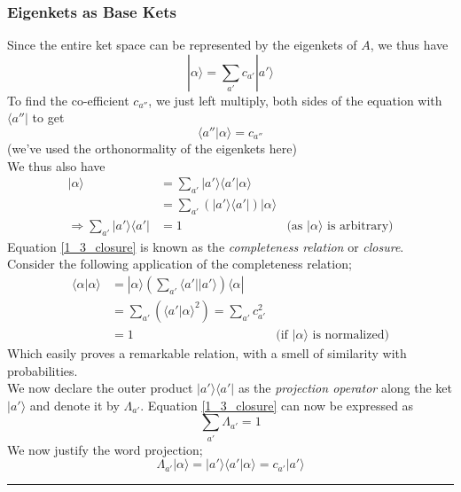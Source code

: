 \documentclass[12pt]{article}
\def\bra#1{\langle#1|}
\def\ket#1{|#1 \rangle}
\def\inpr#1#2{\langle #1|#2 \rangle}
\begin{document}
			\subsubsection{Eigenkets as Base Kets}
				Since the entire ket space can be represented by the eigenkets of $A$, we thus have
				\begin{equation}
					\ket \alpha = \sum_{a'} c_{a'}\ket{a'}
				\end{equation}
				To find the co-efficient $c_{a''}$, we just left multiply, both sides of the equation with $\bra {a''}$ to get
				\begin{equation}
					\inpr {a''}{\alpha} = c_{a''}
				\end{equation}
				(we've used the orthonormality of the eigenkets here)\\
				We thus also have
				\begin{align}
					\ket \alpha &= \sum_{a'} \ket {a'} \inpr {a'}{\alpha} \\
								&= \sum_{a'} (\ket {a'} \bra {a'}) \ket{\alpha} \\					
					\Rightarrow \sum_{a'} {\ket {a'} \bra{a'}} &= 1 &\text{(as $\ket \alpha$ is arbitrary)} \label{1_3_closure}
				\end{align}
				Equation \ref{1_3_closure} is known as the \emph{completeness relation} or \emph{closure}.\\
				Consider the following application of the completeness relation;
				\begin{align}
					\inpr \alpha \alpha &= \ket \alpha \left( \sum_{a'} \bra {a'} \ket {a'} \right) \bra \alpha \\
					 					&= \sum_{a'} (\inpr{a'}{\alpha}^2) = \sum_{a'} c_{a'}^2\\
					 					&= 1 								&\text{(if $\ket \alpha$ is normalized)}
				\end{align}
				Which easily proves a remarkable relation, with a smell of similarity with probabilities.\\
				We now declare the outer product $\ket {a'} \bra {a'}$ as the \emph{projection operator} along the ket $\ket {a'}$ and denote it by $\Lambda_{a'}$. Equation \ref{1_3_closure} can now be expressed as
				\begin{equation}
					\sum_{a'} \Lambda_{a'} = 1
				\end{equation}
				We now justify the word projection;
				\begin{equation}
					\Lambda_{a'} \ket \alpha = \ket {a'} \inpr{a'}{\alpha} = c_{a'}\ket {a'}
				\end{equation}
\vspace{12pt}
\hrule
\end{document}
